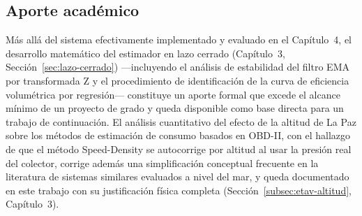 \subsection{Aporte académico}

Más allá del sistema efectivamente implementado y evaluado en el Capítulo~4, el desarrollo matemático del estimador en lazo cerrado (Capítulo~3, Sección~\ref{sec:lazo-cerrado}) —incluyendo el análisis de estabilidad del filtro EMA por transformada Z y el procedimiento de identificación de la curva de eficiencia volumétrica por regresión— constituye un aporte formal que excede el alcance mínimo de un proyecto de grado y queda disponible como base directa para un trabajo de continuación. El análisis cuantitativo del efecto de la altitud de La Paz sobre los métodos de estimación de consumo basados en OBD-II, con el hallazgo de que el método Speed-Density se autocorrige por altitud al usar la presión real del colector, corrige además una simplificación conceptual frecuente en la literatura de sistemas similares evaluados a nivel del mar, y queda documentado en este trabajo con su justificación física completa (Sección~\ref{subsec:etav-altitud}, Capítulo~3).

\clearpage
